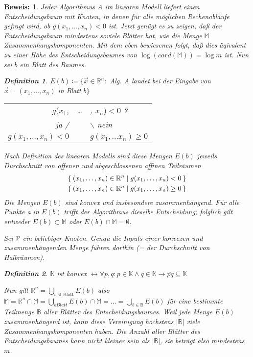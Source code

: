 \documentclass[ngerman,draft,parskip=half*,twoside]{scrreprt}
\theoremstyle{break}
\newtheorem{definition}{Definition}[chapter]
\theoremstyle{nonumberbreak}
\newtheorem{beweis}{Beweis:}
\newcommand*{\B}{\mathbb{B}}
\newcommand*{\K}{\mathbb{K}}
\newcommand*{\M}{\mathbb{M}}
\newcommand*{\R}{\mathbb{R}}        %
\begin{document}
\begin{beweis}
Jeder Algorithmus A im linearen Modell liefert einen Entscheidungsbaum mit Knoten, in denen für alle möglichen Rechenabläufe
gefragt wird, ob $ g( x_1, \dots , x_n) < 0 $  ist. Jetzt genügt es zu zeigen, daß der Entscheidungsbaum mindestens soviele
Blätter hat, wie die Menge $ \M  $ Zusammenhangskomponenten. Mit dem eben bewiesenen folgt, daß dies äqivalent zu einer Höhe
des Entscheidungsbaumes von $\log (card(\M))=\log m$ ist. Nun sei $b$ ein Blatt des Baumes.

  \begin{definition}
  $E(b) \coloneqq  \lbrace \vec x \in \R^n : $ Alg. A landet bei der Eingabe von $ \vec x = (x_1, \dots ,x_n) $ in Blatt $ b \rbrace $
  \end{definition}
		
  \begin{tabular}{rcl}
  $ g(x_1$, & \dots & , $ x_n) < 0 $ ? \\
  ja / & & $ \backslash $ nein\\
  $ g(x_1, \dots, x_n) < 0 $ & & $ g(x_1, \dots x_n) \geq 0 $
  \end{tabular}

  
Nach Definition des linearen Modells sind diese Mengen $E(b)$ jeweils Durchschnitt von offenen und abgeschlossenen affinen Teilräumen
\begin{gather*}
  \Set{(x_1,\ldots,x_{n}) \in \R^n | g(x_1,\ldots,x_{n})<0}\\
  \Set{(x_1,\ldots,x_{n}) \in \R^n | g(x_1,\ldots,x_{n})\geq0}
\end{gather*}
Die Mengen $E(b)$ sind konvex und insbesondere zusammenhängend. Für alle Punkte a in $E(b)$ trifft der Algorithmus dieselbe
Entscheidung; folglich gilt entweder $E(b) \subset \M$ oder $E(b) \cap \M=\emptyset$. 

Sei $\mathcal{V}$ ein beliebiger Knoten.
Genau die Inputs einer konvexen und zusammenhängenden Menge führen dorthin (= der Durchschnitt von Halbräumen).	
  
  \begin{definition}	
  $ \K $ ist \textit{konvex}
  $\leftrightarrow  \forall   p,   q: p\in \K \wedge q \in \K
  \rightarrow  \overline{pq} \subseteq \K$
  \end{definition}
  
Nun  gilt $\R^n = \bigcup_{b \text{ist Blatt}} E(b)$ also
$ \M = \R^n \cap \M = \bigcup_{b   Blatt} E(b) \cap \M = \dots = \bigcup_{b \in \B} E(b) $
für eine bestimmte Teilmenge $\B$ aller Blätter des Entscheidungsbaumes. Weil jede Menge $E(b)$ zusammenhängend ist, kann
diese Vereinigung höchstens $\vert\B\vert$ viele Zusammenhangskomponenten haben. Die Anzahl aller Blätter des
Entscheidungsbaumes kann nicht kleiner sein als $\vert\B\vert$, sie beträgt also mindestens $m$.


\end{beweis}
\end{document}
